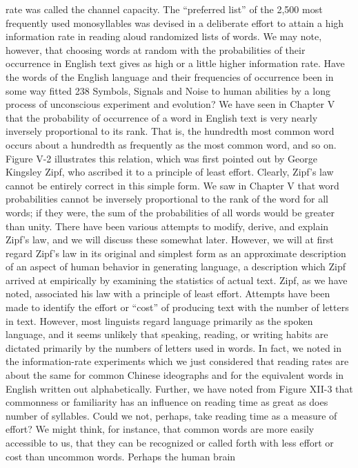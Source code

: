 {{{{{{{{{{{rate was called the channel capacity. The “preferred list” of the
2,500 most frequently used monosyllables was devised in a deliberate
effort to attain a high information rate in reading aloud
randomized lists of words.
We may note, however, that choosing words at random with the
probabilities of their occurrence in English text gives as high or a
little higher information rate. Have the words of the English language
and their frequencies of occurrence been in some way fitted
238 Symbols, Signals and Noise
to human abilities by a long process of unconscious experiment
and evolution?
We have seen in Chapter V that the probability of occurrence
of a word in English text is very nearly inversely proportional to
its rank. That is, the hundredth most common word occurs about
a hundredth as frequently as the most common word, and so on.
Figure V-2 illustrates this relation, which was first pointed out by
George Kingsley Zipf, who ascribed it to a principle of least effort.
Clearly, Zipf’s law cannot be entirely correct in this simple
form. We saw in Chapter V that word probabilities cannot be
inversely proportional to the rank of the word for all words; if they
were, the sum of the probabilities of all words would be greater
than unity. There have been various attempts to modify, derive,
and explain Zipf’s law, and we will discuss these somewhat later.
However, we will at first regard Zipf’s law in its original and
simplest form as an approximate description of an aspect of human
behavior in generating language, a description which Zipf arrived
at empirically by examining the statistics of actual text.
Zipf, as we have noted, associated his law with a principle of least
effort. Attempts have been made to identify the effort or “cost”
of producing text with the number of letters in text. However,
most linguists regard language primarily as the spoken language,
and it seems unlikely that speaking, reading, or writing habits are
dictated primarily by the numbers of letters used in words.
In fact, we noted in the information-rate experiments which we
just considered that reading rates are about the same for common
Chinese ideographs and for the equivalent words in English written
out alphabetically. Further, we have noted from Figure XII-3 that
commonness or familiarity has an influence on reading time as
great as does number of syllables.
Could we not, perhaps, take reading time as a measure of effort?
We might think, for instance, that common words are more easily
accessible to us, that they can be recognized or called forth with
less effort or cost than uncommon words. Perhaps the human brain
}}}}}}}}}}}
